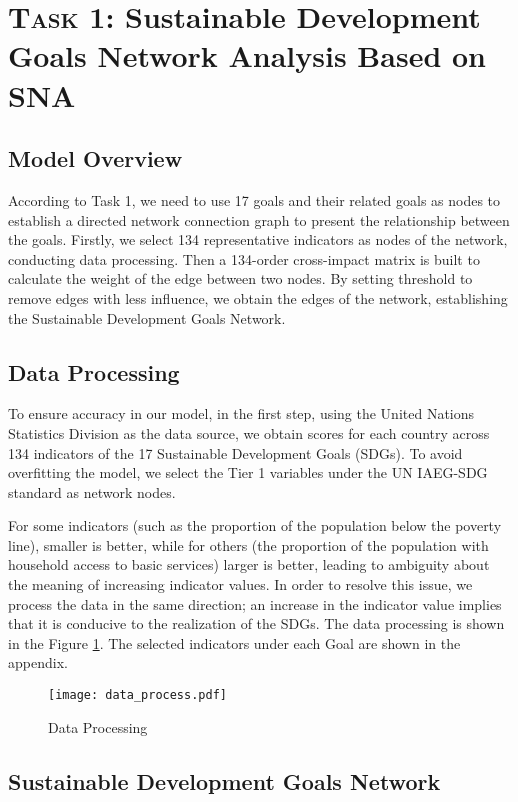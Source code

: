 \documentclass[12pt]{article}  %
\begin{document}
\section{\textsc{Task 1:} Sustainable Development Goals Network Analysis Based on SNA}
\subsection{Model Overview}
According to Task 1, we need to use 17 goals and their related goals as nodes to establish a directed network connection graph to present the relationship between the goals. Firstly, we select 134 representative indicators as nodes of the network,  conducting  data processing. Then a 134-order cross-impact matrix is built  to calculate the weight of the edge between two nodes. By setting threshold to remove edges with less influence, we obtain the edges of the network, establishing the  Sustainable Development Goals Network.

\subsection{Data Processing}
To ensure accuracy in our model, in the first step, using the United Nations Statistics Division as the data source, we obtain scores for each country across 134 indicators of the 17 Sustainable Development Goals (SDGs). To avoid overfitting the model, we select the Tier 1 variables under the UN IAEG-SDG standard as network nodes. 

For some indicators (such as the proportion of the population below the poverty line), smaller is better, while for others (the proportion of the population with household access to basic services) larger is better, leading to ambiguity about the meaning of increasing indicator values. In order to resolve this issue, we process the data in the same direction; an increase in the indicator value implies that it is conducive to the realization of the SDGs. The data processing is shown in the Figure \ref{fig:result}. The selected  indicators under each Goal are shown in the appendix.


\begin{figure}[htbp]
\centering
\texttt{[image: data\_process.pdf]}
\caption{Data Processing}\label{fig:result}
\end{figure}



\subsection{Sustainable Development Goals Network }
\end{document}
